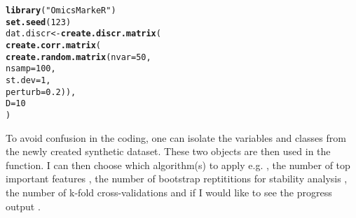 \documentclass[12pt]{article}\usepackage[]{graphicx}\usepackage[usenames,dvipsnames]{color}
\makeatletter
\newcommand{\hlnum}[1]{\textcolor[rgb]{0.686,0.059,0.569}{#1}}%
\newcommand{\hlstr}[1]{\textcolor[rgb]{0.192,0.494,0.8}{#1}}%
\newcommand{\hlstd}[1]{\textcolor[rgb]{0.345,0.345,0.345}{#1}}%
\newcommand{\hlkwb}[1]{\textcolor[rgb]{0.69,0.353,0.396}{#1}}%
\newcommand{\hlkwc}[1]{\textcolor[rgb]{0.333,0.667,0.333}{#1}}%
\newcommand{\hlkwd}[1]{\textcolor[rgb]{0.737,0.353,0.396}{\textbf{#1}}}%
\newenvironment{kframe}{%
 \def\at@end@of@kframe{}%
 \ifinner\ifhmode%
  \def\at@end@of@kframe{\end{minipage}}%
  \begin{minipage}{\columnwidth}%
 \fi\fi%
 \def\FrameCommand##1{\hskip\@totalleftmargin \hskip-\fboxsep
 \colorbox{shadecolor}{##1}\hskip-\fboxsep
     \hskip-\linewidth \hskip-\@totalleftmargin \hskip\columnwidth}%
 \MakeFramed {\advance\hsize-\width
   \@totalleftmargin\z@ \linewidth\hsize
   \@setminipage}}%
 {\par\unskip\endMakeFramed%
 \at@end@of@kframe}
\newenvironment{knitrout}{}{} %
\makeatother
\begin{document}
\begin{knitrout}
\color{fgcolor}\begin{kframe}
\begin{alltt}
\hlkwd{library}\hlstd{(}\hlstr{"OmicsMarkeR"}\hlstd{)}
\hlkwd{set.seed}\hlstd{(}\hlnum{123}\hlstd{)}
\hlstd{dat.discr} \hlkwb{<-} \hlkwd{create.discr.matrix}\hlstd{(}
    \hlkwd{create.corr.matrix}\hlstd{(}
        \hlkwd{create.random.matrix}\hlstd{(}\hlkwc{nvar} \hlstd{=} \hlnum{50}\hlstd{,}
                             \hlkwc{nsamp} \hlstd{=} \hlnum{100}\hlstd{,}
                             \hlkwc{st.dev} \hlstd{=} \hlnum{1}\hlstd{,}
                             \hlkwc{perturb} \hlstd{=} \hlnum{0.2}\hlstd{)),}
    \hlkwc{D} \hlstd{=} \hlnum{10}
\hlstd{)}
\end{alltt}
\end{kframe}
\end{knitrout}
    
To avoid confusion in the coding, one can isolate the variables and classes 
from the newly created synthetic dataset.  These two objects are then used in 
the  function.  I can then choose which algorithm(s) to 
apply e.g. , the number of top important 
features , the number of bootstrap reptititions for stability 
analysis , the number of k-fold cross-validations 
 and if I would like to see the progress output 
.

\end{document}
